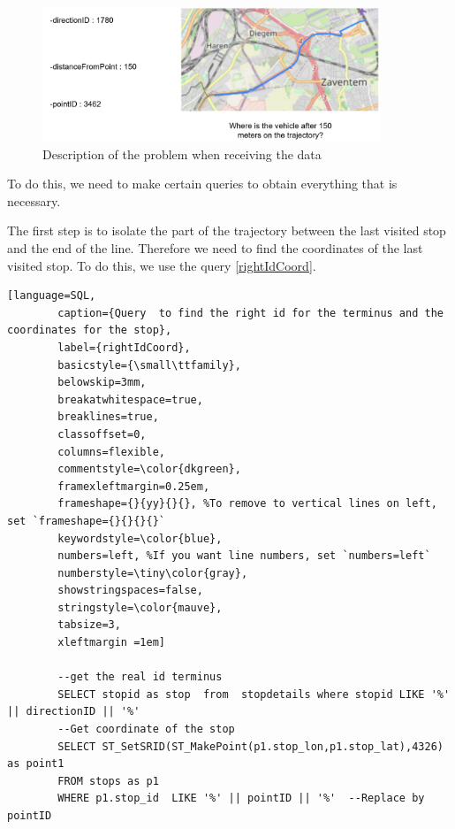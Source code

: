 \documentclass[12pt]{report}
\begin{document}
	\begin{center}
		\begin{figure}
			\centering
			\includegraphics[width=0.9\textwidth]{images/conversionProblem.png}
			\caption{Description of the problem when receiving the data}
			\label{conversionProblem}
		\end{figure}
	\end{center}
	
	
	\vspace{-3cm}
	
	To do this, we need to make certain queries to obtain everything that is necessary.
	
	The first step is to isolate the part of the trajectory between the last visited stop and the end of the line. Therefore we need to find the coordinates of the last visited stop. To do this, we use the query \ref{rightIdCoord}.
	
	\begin{lstlisting}[language=SQL,
		caption={Query  to find the right id for the terminus and the coordinates for the stop},
		label={rightIdCoord},
		basicstyle={\small\ttfamily},
		belowskip=3mm,
		breakatwhitespace=true,
		breaklines=true,
		classoffset=0,
		columns=flexible,
		commentstyle=\color{dkgreen},
		framexleftmargin=0.25em,
		frameshape={}{yy}{}{}, %To remove to vertical lines on left, set `frameshape={}{}{}{}`
		keywordstyle=\color{blue},
		numbers=left, %If you want line numbers, set `numbers=left`
		numberstyle=\tiny\color{gray},
		showstringspaces=false,
		stringstyle=\color{mauve},
		tabsize=3,
		xleftmargin =1em]
		
		--get the real id terminus
		SELECT stopid as stop  from  stopdetails where stopid LIKE '%' || directionID || '%'
		--Get coordinate of the stop 
		SELECT ST_SetSRID(ST_MakePoint(p1.stop_lon,p1.stop_lat),4326) as point1
		FROM stops as p1
		WHERE p1.stop_id  LIKE '%' || pointID || '%'  --Replace by pointID
		
	\end{lstlisting}
	
\end{document}
